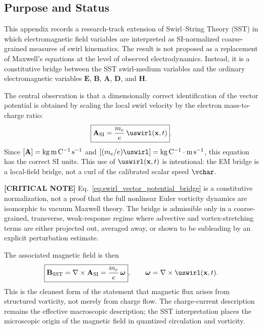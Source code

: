 \subsection{Purpose and Status}
    
    This appendix records a research-track extension of Swirl--String Theory
    (SST) in which electromagnetic field variables are interpreted as
    SI-normalized coarse-grained measures of swirl kinematics.  The result is
    not proposed as a replacement of Maxwell's equations at the level of
    observed electrodynamics.  Instead, it is a constitutive bridge between
    the SST swirl-medium variables and the ordinary electromagnetic variables
    \(\mathbf{E}\), \(\mathbf{B}\), \(\mathbf{A}\), \(\mathbf{D}\), and
    \(\mathbf{H}\).
    
    The central observation is that a dimensionally correct identification of
    the vector potential is obtained by scaling the local swirl velocity by the
    electron mass-to-charge ratio:
    \begin{equation}
        \boxed{
            \mathbf{A}_{\rm SI}
            =
            \frac{m_e}{e}\,
            \uswirl(\mathbf{x},t)
        } .
        \label{eq:swirl_vector_potential_bridge}
    \end{equation}
    Since \([\mathbf{A}]={\rm kg\,m\,C^{-1}\,s^{-1}}\) and
    \([(m_e/e)\uswirl]={\rm kg\,C^{-1}}\cdot{\rm m\,s^{-1}}\), this equation
    has the correct SI units. This use of \(\uswirl(\mathbf{x},t)\) is intentional: the EM bridge is a local-field bridge, not a curl of the calibrated scalar speed \(\vchar\).

    \textbf{[CRITICAL NOTE]} Eq.~\eqref{eq:swirl_vector_potential_bridge} is a constitutive normalization, not a proof that the full nonlinear Euler vorticity dynamics are isomorphic to vacuum Maxwell theory. The bridge is admissible only in a coarse-grained, transverse, weak-response regime where advective and vortex-stretching terms are either projected out, averaged away, or shown to be subleading by an explicit perturbation estimate.
    
    The associated magnetic field is then
    \begin{equation}
        \boxed{
            \mathbf{B}_{\rm SST}
            =
            \nabla\times\mathbf{A}_{\rm SI}
            =
            \frac{m_e}{e}\,
            \boldsymbol{\omega}
        },
        \qquad
        \boldsymbol{\omega}
        =
        \nabla\times\uswirl(\mathbf{x},t) .
        \label{eq:B_from_vorticity}
    \end{equation}
    This is the cleanest form of the statement that magnetic flux arises from
    structured vorticity, not merely from charge flow.  The charge-current
    description remains the effective macroscopic description; the SST
    interpretation places the microscopic origin of the magnetic field in
    quantized circulation and vorticity.

